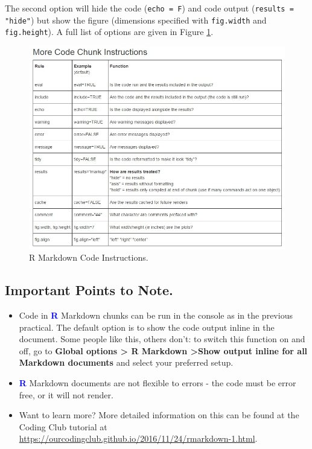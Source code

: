 \documentclass[a4paper,12pt]{article}
\newcommand\boldblue[1]{\textcolor{blue}{\textbf{#1}}}
\begin{document}
The second option will hide the code (\texttt{echo = F}) and code output (\texttt{results = "hide"}) but show the figure (dimensions specified with \texttt{fig.width} and \texttt{fig.height}). A full list of options are given in Figure \ref{fig:markdownrules}.

\begin{figure}[h]
\centering 
\includegraphics[width=1\textwidth]{figs/markdownrules.jpg}
\caption{R Markdown Code Instructions.}
\label{fig:markdownrules}
\end{figure} 


\subsection{Important Points to Note.}

\begin{itemize}

\item Code in \boldblue{R} Markdown chunks can be run in the console as in the previous practical. The default option is to show the code output inline in the document. Some people like this, others don't: to switch this function on and off, go to \textbf{Global options > R Markdown >Show output inline for all Markdown documents} and select your preferred setup.

\item \boldblue{R} Markdown documents are not flexible to errors - the code must be error free, or it will not render.

\item Want to learn more? More detailed information on this can be found at the Coding Club tutorial at \url{https://ourcodingclub.github.io/2016/11/24/rmarkdown-1.html}. \\

\end{itemize}
\end{document}
